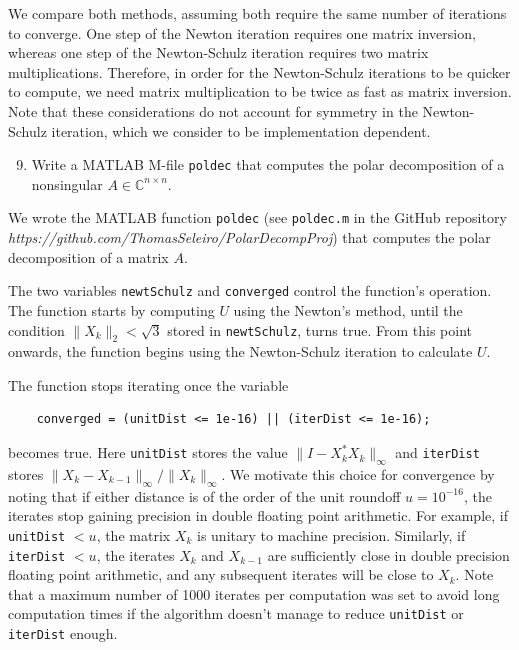 \documentclass[10pt, A4paper]{article}
\newcommand{\nxn}{n \times n}
\begin{document}
We compare both methods, assuming both require the same number of 
iterations to converge. 
One step of the Newton iteration requires one matrix inversion, whereas 
one step of the Newton-Schulz iteration requires two matrix 
multiplications.
Therefore, in order for the Newton-Schulz iterations to be quicker to 
compute, we need matrix multiplication to be twice as fast as matrix 
inversion.
Note that these considerations do not account for symmetry in the 
Newton-Schulz iteration, which we consider to be implementation 
dependent. 





\vspace{0.2cm}
\begin{enumerate}
	\setcounter{enumi}{8}
	\item Write a MATLAB M-file \texttt{poldec} that computes the 
	polar decomposition of a nonsingular $A \in \mathbb{C}^{\nxn}$.
\end{enumerate}

We wrote the MATLAB function \texttt{poldec} (see \texttt{poldec.m} in 
the GitHub repository 
\emph{https://github.com/ThomasSeleiro/PolarDecompProj})
that computes the polar decomposition of a matrix $A$.

The two variables \texttt{newtSchulz} and \texttt{converged} control 
the function's operation.
The function starts by computing $U$ using the Newton's method, until
the condition $\|X_k\|_2 < \sqrt{3}$ stored in \texttt{newtSchulz},
turns true. 
From this point onwards, the function begins using the {Newton-Schulz} 
iteration to calculate $U$.

The function stops iterating once the variable
\begin{verbatim}
	converged = (unitDist <= 1e-16) || (iterDist <= 1e-16);
\end{verbatim}
becomes true.
Here \texttt{unitDist} stores the value $\|I -X_k^*X_k\|_\infty$ and 
\texttt{iterDist} stores $\|X_k - X_{k-1} \|_\infty / \|X_k\|_\infty$.
We motivate this choice for convergence by noting that if either 
distance is of the order of the unit roundoff $u = 10^{-16}$, the 
iterates stop gaining precision in double floating point arithmetic.
For example, if \texttt{unitDist} $< u$, the matrix $X_k$ is unitary to 
machine precision. Similarly, if \texttt{iterDist} $< u$, the iterates 
$X_k$ and $X_{k-1}$ are sufficiently close in double precision floating 
point arithmetic, and any subsequent iterates will be close to $X_k$.
Note that a maximum number of 1000 iterates per computation was set to 
avoid long computation times if the algorithm doesn't manage to reduce 
\texttt{unitDist} or \texttt{iterDist} enough.
\end{document}
